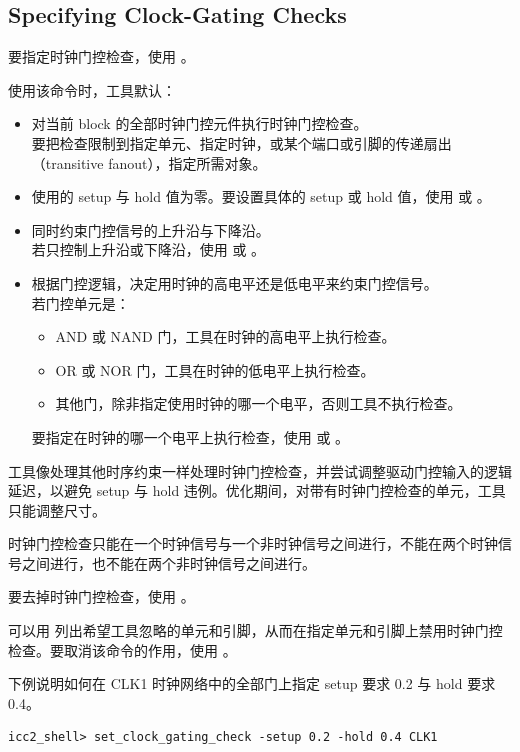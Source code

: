 \subsection*{Specifying Clock-Gating Checks}

要指定时钟门控检查，使用 。

使用该命令时，工具默认：
\begin{itemize}
  \item 对当前 block 的全部时钟门控元件执行时钟门控检查。\\
        要把检查限制到指定单元、指定时钟，或某个端口或引脚的传递扇出（transitive fanout），指定所需对象。
  \item 使用的 setup 与 hold 值为零。要设置具体的 setup 或 hold 值，使用  或 。
  \item 同时约束门控信号的上升沿与下降沿。\\
        若只控制上升沿或下降沿，使用  或 。
  \item 根据门控逻辑，决定用时钟的高电平还是低电平来约束门控信号。\\
        若门控单元是：
        \begin{itemize}
          \item AND 或 NAND 门，工具在时钟的高电平上执行检查。
          \item OR 或 NOR 门，工具在时钟的低电平上执行检查。
          \item 其他门，除非指定使用时钟的哪一个电平，否则工具不执行检查。
        \end{itemize}
        要指定在时钟的哪一个电平上执行检查，使用  或 。
\end{itemize}

工具像处理其他时序约束一样处理时钟门控检查，并尝试调整驱动门控输入的逻辑延迟，以避免 setup 与 hold 违例。优化期间，对带有时钟门控检查的单元，工具只能调整尺寸。

时钟门控检查只能在一个时钟信号与一个非时钟信号之间进行，不能在两个时钟信号之间进行，也不能在两个非时钟信号之间进行。

要去掉时钟门控检查，使用 。

可以用  列出希望工具忽略的单元和引脚，从而在指定单元和引脚上禁用时钟门控检查。要取消该命令的作用，使用 。

下例说明如何在 CLK1 时钟网络中的全部门上指定 setup 要求 0.2 与 hold 要求 0.4。
\begin{lstlisting}
icc2_shell> set_clock_gating_check -setup 0.2 -hold 0.4 CLK1
\end{lstlisting}
